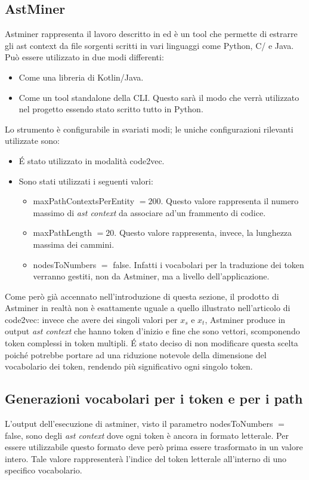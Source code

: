 \subsection{AstMiner}
Astminer rappresenta il lavoro descritto in \cite{kovalenko2019pathminer} ed è un tool che permette di estrarre gli ast context da file sorgenti scritti in vari linguaggi come Python, C/\CPP{} e Java.
Può essere utilizzato in due modi differenti:
  \begin{itemize}
    \item Come una libreria di Kotlin/Java.
    \item Come un tool standalone della CLI. Questo sarà il modo che verrà utilizzato nel progetto essendo stato scritto tutto in Python.
  \end{itemize}
Lo strumento è configurabile in svariati modi; le uniche configurazioni rilevanti utilizzate sono:
  \begin{itemize}
    \item \'E stato utilizzato in modalità code2vec.
    \item Sono stati utilizzati i seguenti valori:
      \begin{itemize}
        \item maxPathContextsPerEntity $=200$. Questo valore rappresenta il numero massimo di \textit{ast context} da associare ad'un frammento di codice.
        \item maxPathLength $=20$. Questo valore rappresenta, invece, la lunghezza massima dei cammini.
        \item nodesToNumbers $=$ false. Infatti i vocabolari per la traduzione dei token verranno gestiti, non da Astminer, ma a livello dell'applicazione.
      \end{itemize}
  \end{itemize}
Come però già accennato nell'introduzione di questa sezione, il prodotto di Astminer in realtà non è esattamente uguale a quello illustrato nell'articolo di code2vec: invece che avere dei singoli valori per $x_s$ e $x_t$, Astminer produce in output \textit{ast context} che hanno token d'inizio e fine che sono vettori, scomponendo token complessi in token multipli.
\'E stato deciso di non modificare questa scelta poiché potrebbe portare ad una riduzione notevole della dimensione del vocabolario dei token, rendendo più significativo ogni singolo token.


\subsection{Generazioni vocabolari per i token e per i path}\label{subsec:vocab}
L'output dell'esecuzione di astminer, visto il parametro nodesToNumbers $=$ false, sono degli \textit{ast context} dove ogni token è ancora in formato letterale.
Per essere utilizzabile questo formato deve però prima essere trasformato in un valore intero.
Tale valore rappresenterà l'indice del token letterale all'interno di uno specifico vocabolario.

